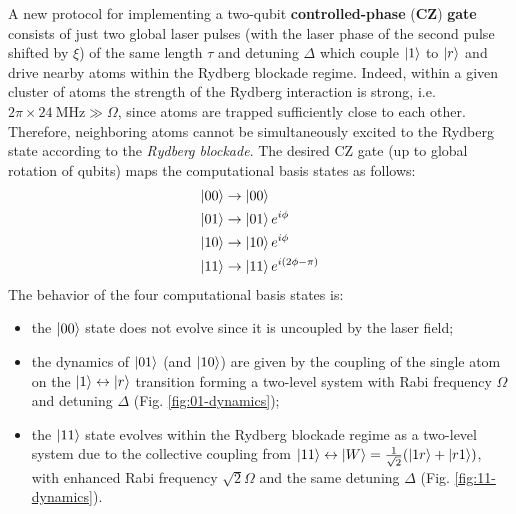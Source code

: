 \documentclass[rmp,10pt,onecolumn,fleqn,notitlepage]{revtex4-1}
\begin{document}
A new protocol for implementing a two-qubit \textbf{controlled-phase} (\textbf{CZ}) \textbf{gate} consists of just two global laser pulses (with the laser phase of the second pulse shifted by $\xi$) of the same length $\tau$ and detuning $\Delta$ which couple $\left\vert{1}\right\rangle$ to $\left\vert{r}\right\rangle$ and drive nearby atoms within the Rydberg blockade regime. Indeed, within a given cluster of atoms the strength of the Rydberg interaction is strong, i.e. $2 \pi \times \SI{24}{\MHz} \gg \Omega$, since atoms are trapped  sufficiently close to each other. Therefore, neighboring atoms cannot be simultaneously excited to the Rydberg state according to the \textit{Rydberg blockade}. The desired CZ gate (up to global rotation of qubits) maps the computational basis states as follows:
\begin{equation}
    \begin{aligned}
        \left\vert{00}\right\rangle & \rightarrow \left\vert{00}\right\rangle \\
        \left\vert{01}\right\rangle & \rightarrow \left\vert{01}\right\rangle e^{i\phi} \\
        \left\vert{10}\right\rangle & \rightarrow \left\vert{10}\right\rangle e^{i\phi}\\
        \left\vert{11}\right\rangle & \rightarrow \left\vert{11}\right\rangle e^{i(2\phi-\pi)}\\
    \end{aligned}
    \label{eq:CZ-gate-map}
\end{equation}
The behavior of the four computational basis states is: 
\begin{itemize}
    \item the $\left\vert{00}\right\rangle$ state does not evolve since it is uncoupled by the laser field;
    \item the dynamics of $\left\vert{01}\right\rangle$ (and $\left\vert{10}\right\rangle$) are given by the coupling of the single atom on the $\left\vert{1}\right\rangle \leftrightarrow \left\vert{r}\right\rangle$ transition forming a two-level system with Rabi frequency $\Omega$ and detuning $\Delta$ (Fig. \ref{fig:01-dynamics});
    \item the $\left\vert{11}\right\rangle$ state evolves within the Rydberg blockade regime as a two-level system due to the collective coupling from $\left\vert{11}\right\rangle \leftrightarrow \left\vert{W}\right\rangle = \frac{1}{\sqrt{2}}(\left\vert{1r}\right\rangle+\left\vert{r1}\right\rangle)$, with enhanced Rabi frequency $\sqrt{2}\Omega$ and the same detuning $\Delta$ (Fig. \ref{fig:11-dynamics}).
\end{itemize}
\end{document}
